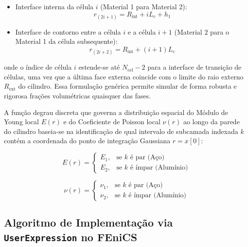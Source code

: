 \begin{itemize}
  \item Interface interna da célula $i$ (Material 1 para Material 2):
  \begin{equation}
    r_{(2i+1)} = R_{\text{int}} + i L_c + h_1
    \label{eq:interface_interna}
  \end{equation}

  \item Interface de contorno entre a célula $i$ e a célula $i+1$ (Material 2 para o Material 1 da célula subsequente):
  \begin{equation}
    r_{(2i+2)} = R_{\text{int}} + (i + 1) L_c
    \label{eq:interface_externa}
  \end{equation}
\end{itemize}

onde o índice de célula $i$ estende-se até $N_{\text{cel}} - 2$ para a interface de transição de células, uma vez que a última face externa coincide com o limite do raio externo $R_{\text{ext}}$ do cilindro. Essa formulação genérica permite simular de forma robusta e rigorosa frações volumétricas quaisquer das fases.

A função degrau discreta que governa a distribuição espacial do Módulo de Young local $E(r)$ e do Coeficiente de Poisson local $\nu(r)$ ao longo da parede do cilindro baseia-se na identificação de qual intervalo de subcamada indexada $k$ contém a coordenada do ponto de integração Gaussiana $r = x[0]$:

\begin{equation}
  E(r) = \begin{cases} 
    E_1, & \text{se } k \text{ é par (Aço)} \\ 
    E_2, & \text{se } k \text{ é ímpar (Alumínio)} 
  \end{cases}
  \label{eq:mapeamento_E_v2}
\end{equation}

\begin{equation}
  \nu(r) = \begin{cases} 
    \nu_1, & \text{se } k \text{ é par (Aço)} \\ 
    \nu_2, & \text{se } k \text{ é ímpar (Alumínio)} 
  \end{cases}
  \label{eq:mapeamento_nu_v2}
\end{equation}

\subsection{Algoritmo de Implementação via \texttt{UserExpression} no FEniCS}

